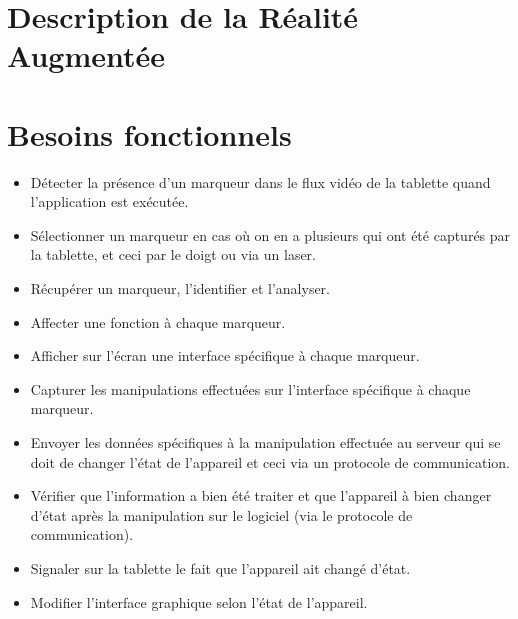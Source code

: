 \documentclass[12pt,a4paper]{article}
\begin{document}
\section{Description de la Réalité Augmentée}

\section{Besoins fonctionnels}
\begin{itemize}
 \item Détecter la présence d'un marqueur dans le flux vidéo de la tablette quand l'application est exécutée.
 \item Sélectionner un marqueur en cas où on en a plusieurs qui ont été capturés par la tablette, et ceci par le doigt ou via un laser.
 \item Récupérer un marqueur, l'identifier et l'analyser.
 \item Affecter une fonction à chaque marqueur.
 \item Afficher sur l'écran une interface spécifique à chaque marqueur.
 \item Capturer les manipulations effectuées sur l'interface spécifique à chaque marqueur.
 \item Envoyer les données spécifiques à la manipulation effectuée au serveur qui se doit de changer l'état de l'appareil et ceci via un protocole de communication.
 \item Vérifier que l'information a bien été traiter et que l'appareil à bien changer d'état après la manipulation sur le logiciel (via le protocole de communication).
 \item Signaler sur la tablette le fait que l'appareil ait changé d'état.
 \item Modifier l'interface graphique selon l'état de l'appareil.
\end{itemize}
\end{document}
